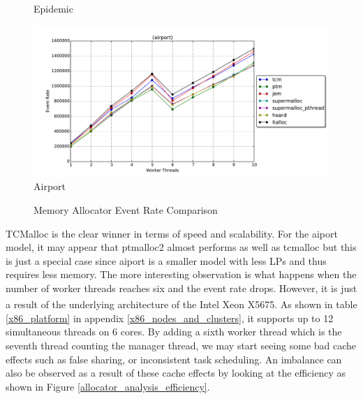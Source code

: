 \documentclass[11pt]{book}
\begin{document}
\begin{figure}
\begin{minipage}{.5\textwidth}
\begin{center}
      Epidemic \\
    \end{center}
  \end{minipage}%
  \begin{minipage}{.5\textwidth}
    \begin{center}
      \includegraphics[width=\textwidth,keepaspectratio,quiet]{figs/memory_allocation/airport_eventrate.pdf} \\
      Airport \\
    \end{center}
  \end{minipage}
  \caption{Memory Allocator Event Rate Comparison}\label{allocator_analysis_eventrate}
\end{figure}

TCMalloc is the clear winner in terms of speed and scalability.  For the aiport model, it may
appear that ptmalloc2 almost performs as well as tcmalloc but this is just a special case since
aiport is a smaller model with less LPs and thus requires less memory.  The more interesting
observation is what happens when the number of worker threads reaches six and the event rate
drops.  However, it is just a result of the underlying architecture of the
Intel\textsuperscript{\textregistered} Xeon\textsuperscript{\textregistered} X5675.  As shown in
table \ref{x86_platform} in appendix \ref{x86_nodes_and_clusters}, it supports up to 12 simultaneous
threads on 6 cores.  By adding a sixth worker thread which is the seventh thread counting the
manager thread, we may start seeing some bad cache effects such as false sharing, or inconsistent
task scheduling.  An imbalance can also be observed as a result of these cache effects by looking at
the efficiency as shown in Figure \ref{allocator_analysis_efficiency}.
\end{document}
